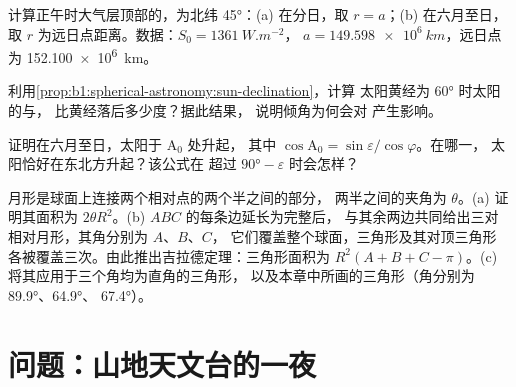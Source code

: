\begin{exercise}[$\star\star$]\label{exo:b1:spherical-astronomy:9}
计算正午时大气层顶部的，为北纬
\ang{45}：(a) 在分日，取 $r = a$；(b) 在六月至日，
取 $r$ 为远日点距离。数据：$S_0 = \qty{1361}{W.m^{-2}}$，
$a = \qty{149.598e6}{km}$，远日点为 \qty{152.100e6}{km}。
\end{exercise}

\begin{exercise}[$\star\star\star$]\label{exo:b1:spherical-astronomy:10}
利用\cref{prop:b1:spherical-astronomy:sun-declination}，计算
太阳黄经为 \ang{60} 时太阳的与，
比黄经落后多少度？据此结果，
说明倾角为何会对
产生影响。
\end{exercise}

\begin{exercise}[$\star\star\star$]\label{exo:b1:spherical-astronomy:11}
证明在六月至日，太阳于 $\mathrm{A}_0$ 处升起，
其中 $\cos\mathrm{A}_0 = \sin\varepsilon/\cos\varphi$。在哪一，
太阳恰好在东北方升起？该公式在
超过 $\ang{90} - \varepsilon$ 时会怎样？
\end{exercise}

\begin{exercise}[$\star\star\star$]\label{exo:b1:spherical-astronomy:12}
月形是球面上连接两个相对点的两个半之间的部分，
两半之间的夹角为 $\theta$。(a) 证明其面积为
$2\theta R^2$。(b)  $ABC$ 的每条边延长为完整后，
与其余两边共同给出三对相对月形，其角分别为 $A$、$B$、$C$，
它们覆盖整个球面，三角形及其对顶三角形
各被覆盖三次。由此推出吉拉德定理：三角形面积为
$R^2(A + B + C - \pi)$。(c) 将其应用于三个角均为直角的三角形，
以及本章中所画的三角形（角分别为 \ang{89.9}、\ang{64.9}、
\ang{67.4}）。
\end{exercise}

\section{问题：山地天文台的一夜}


